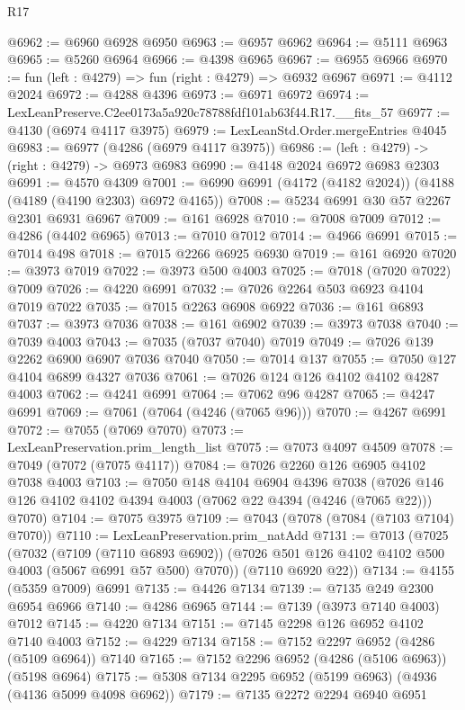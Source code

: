 \begin{lexlean}{R17}
\begin{coremodule}
@6962 := @6960 @6928 @6950
@6963 := @6957 @6962
@6964 := @5111 @6963
@6965 := @5260 @6964
@6966 := @4398 @6965
@6967 := @6955 @6966
@6970 := fun (left : @4279) => fun (right : @4279) => @6932 @6967
@6971 := @4112 @2024
@6972 := @4288 @4396
@6973 := @6971 @6972
@6974 := LexLeanPreserve.C2ee0173a5a920c78788fdf101ab63f44.R17.__fits_57
@6977 := @4130 (@6974 @4117 @3975)
@6979 := LexLeanStd.Order.mergeEntries @4045
@6983 := @6977 (@4286 (@6979 @4117 @3975))
@6986 := (left : @4279) -> (right : @4279) -> @6973 @6983
@6990 := @4148 @2024 @6972 @6983 @2303
@6991 := @4570 @4309
@7001 := @6990 @6991 (@4172 (@4182 @2024)) (@4188 (@4189 (@4190 @2303) @6972 @4165))
@7008 := @5234 @6991 @30 @57 @2267 @2301 @6931 @6967
@7009 := @161 @6928
@7010 := @7008 @7009
@7012 := @4286 (@4402 @6965)
@7013 := @7010 @7012
@7014 := @4966 @6991
@7015 := @7014 @498
@7018 := @7015 @2266 @6925 @6930
@7019 := @161 @6920
@7020 := @3973 @7019
@7022 := @3973 @500 @4003
@7025 := @7018 (@7020 @7022) @7009
@7026 := @4220 @6991
@7032 := @7026 @2264 @503 @6923 @4104 @7019 @7022
@7035 := @7015 @2263 @6908 @6922
@7036 := @161 @6893
@7037 := @3973 @7036
@7038 := @161 @6902
@7039 := @3973 @7038
@7040 := @7039 @4003
@7043 := @7035 (@7037 @7040) @7019
@7049 := @7026 @139 @2262 @6900 @6907 @7036 @7040
@7050 := @7014 @137
@7055 := @7050 @127 @4104 @6899 @4327 @7036
@7061 := @7026 @124 @126 @4102 @4102 @4287 @4003
@7062 := @4241 @6991
@7064 := @7062 @96 @4287
@7065 := @4247 @6991
@7069 := @7061 (@7064 (@4246 (@7065 @96)))
@7070 := @4267 @6991
@7072 := @7055 (@7069 @7070)
@7073 := LexLeanPreservation.prim_length_list
@7075 := @7073 @4097 @4509
@7078 := @7049 (@7072 (@7075 @4117))
@7084 := @7026 @2260 @126 @6905 @4102 @7038 @4003
@7103 := @7050
    @148
    @4104
    @6904
    @4396
    @7038
    (@7026 @146 @126 @4102 @4102 @4394 @4003 (@7062 @22 @4394 (@4246 (@7065 @22))) @7070)
@7104 := @7075 @3975
@7109 := @7043 (@7078 (@7084 (@7103 @7104) @7070))
@7110 := LexLeanPreservation.prim_natAdd
@7131 := @7013
    (@7025
      (@7032
        (@7109 (@7110 @6893 @6902))
        (@7026 @501 @126 @4102 @4102 @500 @4003 (@5067 @6991 @57 @500) @7070))
      (@7110 @6920 @22))
@7134 := @4155 (@5359 @7009) @6991
@7135 := @4426 @7134
@7139 := @7135 @249 @2300 @6954 @6966
@7140 := @4286 @6965
@7144 := @7139 (@3973 @7140 @4003) @7012
@7145 := @4220 @7134
@7151 := @7145 @2298 @126 @6952 @4102 @7140 @4003
@7152 := @4229 @7134
@7158 := @7152 @2297 @6952 (@4286 (@5109 @6964)) @7140
@7165 := @7152 @2296 @6952 (@4286 (@5106 @6963)) (@5198 @6964)
@7175 := @5308 @7134 @2295 @6952 (@5199 @6963) (@4936 (@4136 @5099 @4098 @6962))
@7179 := @7135 @2272 @2294 @6940 @6951

\end{coremodule}
\end{lexlean}
